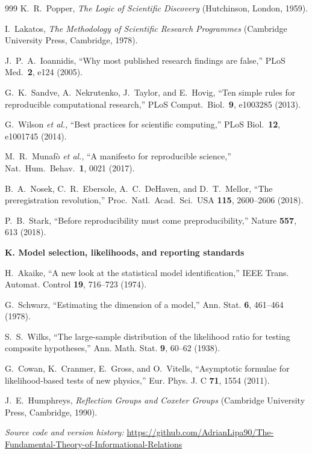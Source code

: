 \documentclass[11pt,a4paper,twoside]{book}
\theoremstyle{definition}
\begin{document}
\begin{thebibliography}{999}
K.~R.~Popper,
\emph{The Logic of Scientific Discovery}
(Hutchinson, London, 1959).

I.~Lakatos,
\emph{The Methodology of Scientific Research Programmes}
(Cambridge University Press, Cambridge, 1978).

J.~P.~A.~Ioannidis,
``Why most published research findings are false,''
PLoS Med.\ \textbf{2}, e124 (2005).

G.~K.~Sandve, A.~Nekrutenko, J.~Taylor, and E.~Hovig,
``Ten simple rules for reproducible computational research,''
PLoS Comput.\ Biol.\ \textbf{9}, e1003285 (2013).

G.~Wilson \emph{et al.},
``Best practices for scientific computing,''
PLoS Biol.\ \textbf{12}, e1001745 (2014).

M.~R.~Munaf\`o \emph{et al.},
``A manifesto for reproducible science,''
Nat.\ Hum.\ Behav.\ \textbf{1}, 0021 (2017).

B.~A.~Nosek, C.~R.~Ebersole, A.~C.~DeHaven, and D.~T.~Mellor,
``The preregistration revolution,''
Proc.\ Natl.\ Acad.\ Sci.\ USA \textbf{115}, 2600--2606 (2018).

P.~B.~Stark,
``Before reproducibility must come preproducibility,''
Nature \textbf{557}, 613 (2018).



\item[]\textbf{K. Model selection, likelihoods, and reporting standards}

H.~Akaike,
``A new look at the statistical model identification,''
IEEE Trans. Automat. Control \textbf{19}, 716--723 (1974).

G.~Schwarz,
``Estimating the dimension of a model,''
Ann. Stat. \textbf{6}, 461--464 (1978).

S.~S.~Wilks,
``The large-sample distribution of the likelihood ratio for testing composite
hypotheses,'' Ann. Math. Stat. \textbf{9}, 60--62 (1938).

G.~Cowan, K.~Cranmer, E.~Gross, and O.~Vitells,
``Asymptotic formulae for likelihood-based tests of new physics,''
Eur. Phys. J. C \textbf{71}, 1554 (2011).

J.~E.~Humphreys,
\emph{Reflection Groups and Coxeter Groups}
(Cambridge University Press, Cambridge, 1990).

\end{thebibliography}



\vfill
\noindent\small\textit{Source code and version history:}
\url{https://github.com/AdrianLipa90/The-Fundamental-Theory-of-Informational-Relations}
\par\vspace{2cm}
\backmatter
\printindex
\end{document}
